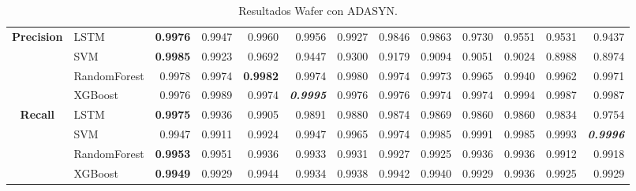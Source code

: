 \begin{table}[H]
\begin{adjustbox}{max width=14cm}
\begin{tabular}{|c|l|r|r|r|r|r|r|r|r|r|r|r|}
			\hline
			\textbf{Precision} &  LSTM & \textbf{  0.9976 } &  0.9947 &  0.9960 &  0.9956 &  0.9927 &  0.9846 &  0.9863 &  0.9730 &  0.9551 &  0.9531 &  0.9437 \\
			&  SVM & \textbf{  0.9985 } &  0.9923 &  0.9692 &  0.9447 &  0.9300 &  0.9179 &  0.9094 &  0.9051 &  0.9024 &  0.8988 &  0.8974 \\
			&  RandomForest &  0.9978 &  0.9974 & \textbf{  0.9982 } &  0.9974 &  0.9980 &  0.9974 &  0.9973 &  0.9965 &  0.9940 &  0.9962 &  0.9971 \\
			&  XGBoost &  0.9976 &  0.9989 &  0.9974 & \textit{ \textbf{  0.9995 } } &  0.9976 &  0.9976 &  0.9974 &  0.9974 &  0.9994 &  0.9987 &  0.9987 \\
			\hline
			\textbf{Recall} &  LSTM & \textbf{  0.9975 } &  0.9936 &  0.9905 &  0.9891 &  0.9880 &  0.9874 &  0.9869 &  0.9860 &  0.9860 &  0.9834 &  0.9754 \\
			&  SVM &  0.9947 &  0.9911 &  0.9924 &  0.9947 &  0.9965 &  0.9974 &  0.9985 &  0.9991 &  0.9985 &  0.9993 & \textit{ \textbf{  0.9996 } } \\
			&  RandomForest & \textbf{  0.9953 } &  0.9951 &  0.9936 &  0.9933 &  0.9931 &  0.9927 &  0.9925 &  0.9936 &  0.9936 &  0.9912 &  0.9918 \\
			&  XGBoost & \textbf{  0.9949 } &  0.9929 &  0.9944 &  0.9934 &  0.9938 &  0.9942 &  0.9940 &  0.9929 &  0.9936 &  0.9925 &  0.9929 \\
			\hline
		\end{tabular}
	\end{adjustbox}
	\caption{Resultados Wafer con ADASYN.}
	\label{tab:Wafer_ADASYN}
\end{table}


